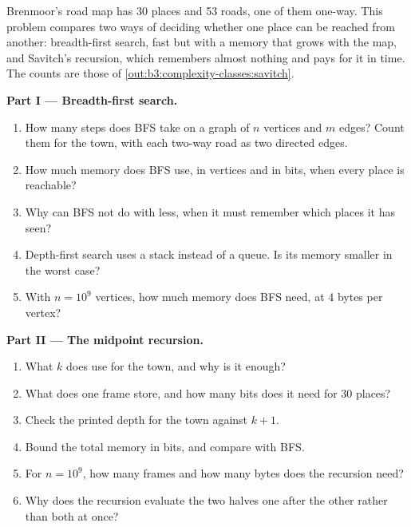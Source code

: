 \begin{problem}\label{pb:b3:complexity-classes:1}
Brenmoor's road map has 30 places and 53 roads, one of them one-way. This problem compares two ways of deciding whether one place can be reached from another: breadth-first search, fast but with a memory that grows with the map, and Savitch's recursion, which remembers almost nothing and pays for it in time. The counts are those of \cref{out:b3:complexity-classes:savitch}.

\medskip\noindent\textbf{Part I --- Breadth-first search.}
\begin{enumerate}
  \item How many steps does BFS take on a graph of $n$ vertices and $m$ edges? Count them for the town, with each two-way road as two directed edges.
  \item How much memory does BFS use, in vertices and in bits, when every place is reachable?
  \item Why can BFS not do with less, when it must remember which places it has seen?
  \item Depth-first search uses a stack instead of a queue. Is its memory smaller in the worst case?
  \item With $n = 10^9$ vertices, how much memory does BFS need, at 4 bytes per vertex?
\end{enumerate}

\medskip\noindent\textbf{Part II --- The midpoint recursion.}
\begin{enumerate}[resume]
  \item What $k$ does  use for the town, and why is it enough?
  \item What does one frame store, and how many bits does it need for 30 places?
  \item Check the printed depth for the town against $k + 1$.
  \item Bound the total memory in bits, and compare with BFS.
  \item For $n = 10^9$, how many frames and how many bytes does the recursion need?
  \item Why does the recursion evaluate the two halves one after the other rather than both at once?
\end{enumerate}


\end{problem}
